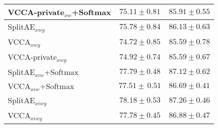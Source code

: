 \begin{table}[t]
\begin{tabular}{l c c}
    VCCA-private$_{x w}$+Softmax & $75.11 \pm 0.81$ & $85.91 \pm 0.55$ \\ \hline
    \rowcolor{gray!30} 
    SplitAE$_{x w y}$ & $75.78 \pm 0.84$ & $86.13 \pm 0.63$ \\ 
    VCCA$_{x w y}$ & $74.72 \pm 0.85$ & $85.59 \pm 0.78$ \\ 
    \rowcolor{gray!30}  
    VCCA-private$_{x w y}$ & $74.92 \pm 0.74$ & $85.59 \pm 0.67$ \\
    \hline
    SplitAE$_{x i w}$+Softmax & $77.79 \pm 0.48$ & $87.12 \pm 0.62$ \\
    \rowcolor{gray!30}  
    VCCA$_{x i w}$+Softmax & $77.51 \pm \, 0.51$ & $86.69 \pm 0.41$ \\   
    \hline
    SplitAE$_{x i w y}$  & $78.18 \pm 0.53$ & $87.26 \pm 0.46$ \\ 
    \rowcolor{gray!30}
    VCCA$_{x i w y}$ &  $77.78 \pm 0.45$ & $86.88 \pm 0.47$ \\
    \hline 
\end{tabular}
\label{tab:classification_results_on_test_set}
\vspace{-2mm}
\end{table}